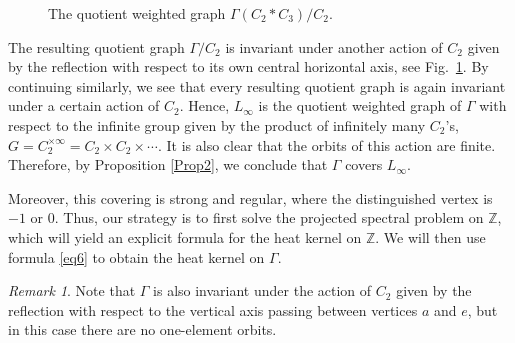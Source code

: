 \documentclass[11pt]{amsart}
\newcommand{\Z}{\mathbb{Z}}
\theoremstyle{definition}
\theoremstyle{remark}
\newtheorem{remark}{Remark}
\theoremstyle{plain}
\numberwithin{equation}{section}
\numberwithin{lemma}{section}
\numberwithin{definition}{section}
\numberwithin{proposition}{section}
\numberwithin{corollary}{section}
\numberwithin{theorem}{section}
\numberwithin{remark}{section}
\begin{document}
\begin{figure}
\caption{The quotient weighted graph $\Gamma(C_2*C_3)/C_2$.} \label{fig:quotient}
\end{figure}

The resulting quotient graph $\Gamma/C_2$ is invariant under another action of $C_2$ given by the reflection with respect to its own central horizontal axis, see Fig.~\ref{fig:quotient}. By continuing similarly, we see that every resulting quotient graph is again invariant under a certain action of $C_2$. Hence, $L_{\infty}$ is the quotient weighted graph of $\Gamma$ with respect to the infinite group given by the product of infinitely many $C_2$'s, $G=C_2^{\times \infty}=C_2\times C_2\times\dotsm$.  It is also clear that the orbits of this action are finite. Therefore, by Proposition \ref{Prop2}, we conclude that $\Gamma$ covers $L_{\infty}$.

Moreover, this covering is strong and regular, where the distinguished vertex is $-1$ or $0$. Thus, our strategy is to first solve the projected spectral problem on $\Z$, which will yield an explicit formula for the heat kernel on $\Z$. We will then use formula \eqref{eq6} to obtain the heat kernel on $\Gamma$.

\begin{remark}
Note that $\Gamma$ is also invariant under the action of $C_2$ given by the reflection with respect to the vertical axis passing between vertices $a$ and $e$, but in this case there are no one-element orbits. 
\end{remark}
\end{document}
